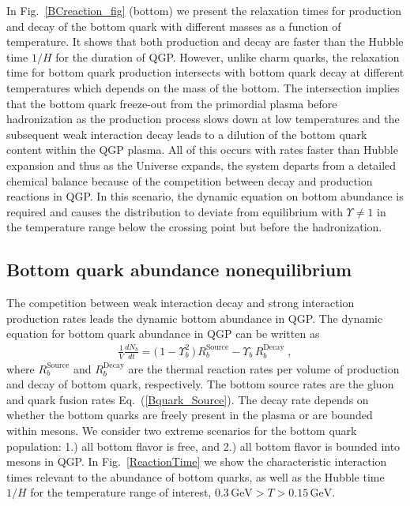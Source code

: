 In Fig.~\ref{BCreaction_fig} (bottom) we present the relaxation times for production and decay of the bottom quark with different masses as a function of temperature. It shows that both production and decay are faster than the Hubble time $1/H$ for the duration of QGP. However, unlike charm quarks, the relaxation time for bottom quark production intersects with bottom quark decay at different temperatures which depends on the mass of the bottom. The intersection implies that the bottom quark freeze-out from the primordial plasma before hadronization as the production process slows down at low temperatures and the subsequent weak interaction decay leads to a dilution of the bottom quark content within the QGP plasma. All of this occurs with rates faster than Hubble expansion and thus as the Universe expands, the system departs from a detailed chemical balance because of the competition between decay and production reactions in QGP. In this scenario, the dynamic equation on bottom abundance is required and causes the distribution to deviate from equilibrium with $\Upsilon\neq1$ in the temperature range below the crossing point but before the hadronization. 



\subsection{Bottom quark abundance nonequilibrium}

The competition between weak interaction decay and strong interaction production rates leads the dynamic bottom abundance in QGP. The dynamic equation for bottom quark abundance in QGP can be written as 
\begin{align}
\label{Bquark_eq}
\frac{1}{V}\frac{dN_b}{dt}=\big(\,1-\Upsilon^2_{b}\,\big)\,R^{\mathrm{Source}}_{b}-\Upsilon_b\,R^{\mathrm{Decay}}_{b}\;,
\end{align}
where $R^{\mathrm{Source}}_{b}$ and $R^{\mathrm{Decay}}_{b}$ are the thermal reaction rates per volume of production and decay of bottom quark, respectively. The bottom source rates are the gluon and quark fusion rates Eq.~(\ref{Bquark_Source}). The decay rate depends on whether the bottom quarks are freely present in the plasma or are bounded within mesons. We consider two extreme scenarios for the bottom quark population: 1.) all bottom flavor is free, and 2.) all bottom flavor is bounded into mesons in QGP. In Fig.~\ref{ReactionTime}  we show the characteristic interaction times relevant to the abundance of bottom quarks, as well as the Hubble time $1/H$ for the temperature range of interest, $0.3\,\mathrm{GeV}> T> 0.15\,\mathrm{GeV}$.

